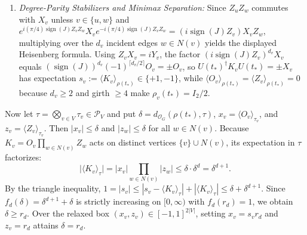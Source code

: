 \documentclass[
  11pt,
]{article}
\providecommand{\tightlist}{%
  \setlength{\itemsep}{0pt}\setlength{\parskip}{0pt}}
\providecommand{\tightlist}{%
  \setlength{\itemsep}{0pt}\setlength{\parskip}{0pt}}
\begin{document}
\begin{enumerate}
\def\labelenumi{\arabic{enumi}.}
\setcounter{enumi}{1}
\tightlist
\item
  \emph{Degree-Parity Stabilizers and Minimax Separation:} Since \(Z_u Z_w\) commutes with \(X_v\) unless \(v\in\{u,w\}\) and \(e^{i(\pi/4)\operatorname{sign}(J)Z_v Z_w} X_v e^{-i(\pi/4)\operatorname{sign}(J)Z_v Z_w} = (i\operatorname{sign}(J)Z_v)X_v Z_w\), multiplying over the \(d_v\) incident edges \(w\in N(v)\) yields the displayed Heisenberg formula. Using \(Z_v X_v = iY_v\), the factor \((i\operatorname{sign}(J)Z_v)^{d_v}X_v\) equals \((\operatorname{sign}(J))^{d_v}(-1)^{\lceil d_v/2\rceil} O_v = \pm O_v\), so \(U(t_*)^\dagger K_v U(t_*) = \pm X_v\) has expectation \(s_v := \langle K_v\rangle_{\rho(t_*)} \in \{+1,-1\}\), while \(\langle O_v\rangle_{\rho(t_*)} = \langle Z_v\rangle_{\rho(t_*)} = 0\) because \(d_v \ge 2\) and girth \(\ge 4\) make \(\rho_v(t_*) = I_2/2\).
\end{enumerate}

Now let \(\tau = \bigotimes_{v\in V}\tau_v \in \mathcal{P}_V\) and put \(\delta = d_{\mathcal{O}_G}(\rho(t_*),\tau)\), \(x_v = \langle O_v\rangle_{\tau_v}\), and \(z_v = \langle Z_v\rangle_{\tau_v}\). Then \(|x_v| \le \delta\) and \(|z_w| \le \delta\) for all \(w\in N(v)\). Because \(K_v = O_v \prod_{w\in N(v)} Z_w\) acts on distinct vertices \(\{v\}\cup N(v)\), its expectation in \(\tau\) factorizes:
\[
\lvert\langle K_v\rangle_\tau\rvert = |x_v| \prod_{w\in N(v)} |z_w| \le \delta \cdot \delta^d = \delta^{d+1}.
\]
By the triangle inequality, \(1 = |s_v| \le |s_v - \langle K_v\rangle_\tau| + |\langle K_v\rangle_\tau| \le \delta + \delta^{d+1}\). Since \(f_d(\delta) = \delta^{d+1} + \delta\) is strictly increasing on \([0,\infty)\) with \(f_d(r_d) = 1\), we obtain \(\delta \ge r_d\). Over the relaxed box \((x_v,z_v)\in[-1,1]^{2|V|}\), setting \(x_v = s_v r_d\) and \(z_v = r_d\) attains \(\delta = r_d\).
\end{document}
